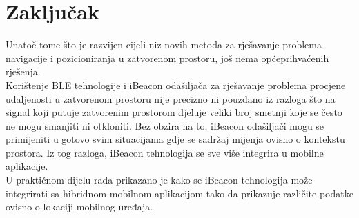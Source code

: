 \chapter{Zaključak}
\label{chap:zakljucak}

Unatoč tome što je razvijen cijeli niz novih metoda za rješavanje problema navigacije i pozicioniranja u zatvorenom prostoru, još nema općeprihvaćenih rješenja. 
\\
Korištenje BLE tehnologije i iBeacon odašiljača za rješavanje problema procjene udaljenosti u zatvorenom prostoru nije precizno ni pouzdano iz razloga što na signal koji putuje zatvorenim prostorom djeluje veliki broj smetnji koje se često ne mogu smanjiti ni otkloniti. 
Bez obzira na to, iBeacon odašiljači mogu se primijeniti u gotovo svim situacijama gdje se sadržaj mijenja ovisno o kontekstu prostora. 
Iz tog razloga, iBeacon tehnologija se sve više integrira u mobilne aplikacije.
\\

U praktičnom dijelu rada prikazano je kako se iBeacon tehnologija može integrirati sa hibridnom mobilnom aplikacijom tako da prikazuje različite podatke ovisno o lokaciji mobilnog uređaja. 
